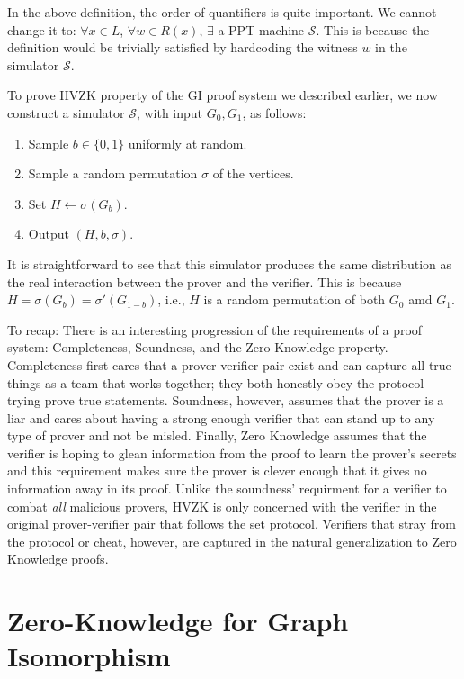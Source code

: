 \begin{remark}
In the above definition, the order of quantifiers is quite important. We cannot change it to: $\forall x \in L$, $\forall w\in R(x)$, $\exists$ a PPT machine $\mathcal{S}$. This is because the definition would be trivially satisfied by hardcoding the witness $w$ in the simulator $\mathcal{S}$.
\end{remark}

To prove HVZK property of the GI proof system we described earlier, we now construct a simulator $\mathcal{S}$, with input $G_0, G_1$, as follows:
\begin{enumerate}
	\item Sample $b\in\{0,1\}$ uniformly at random.
	\item Sample a random permutation $\sigma$ of the vertices.
	\item Set $H \gets \sigma(G_b)$.
	\item Output $(H, b, \sigma)$.
\end{enumerate}
It is straightforward to see that this simulator produces the same distribution as the real interaction between the prover and the verifier. This is because $H = \sigma(G_b) = \sigma'(G_{1-b})$, i.e., $H$ is a random permutation of both $G_0$ amd $G_1$. 
	
To recap: There is an interesting progression of the requirements of a proof system: Completeness, Soundness, and the Zero Knowledge property.  Completeness first cares that a prover-verifier pair exist and can capture all true things as a team that works together; they both honestly obey the protocol trying prove true statements.  Soundness, however, assumes that the prover is a liar and cares about having a strong enough verifier that can stand up to any type of prover and not be misled.  Finally, Zero Knowledge assumes that the verifier is hoping to glean information from the proof to learn the prover's secrets and this requirement makes sure the prover is clever enough that it gives no information away in its proof. Unlike the soundness' requirment for a verifier to combat \textit{all} malicious provers, HVZK is only concerned with the verifier in the original prover-verifier pair that follows the set protocol. Verifiers that stray from the protocol or cheat, however, are captured in the natural generalization to Zero Knowledge proofs.

\section{Zero-Knowledge for Graph Isomorphism}

